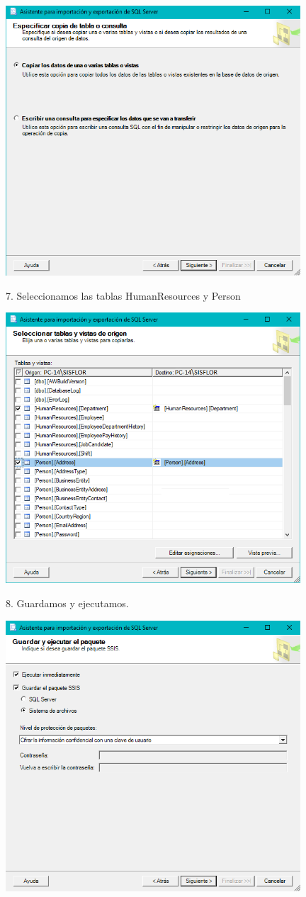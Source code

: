 	\begin{center}
	\includegraphics[width=11cm]{./Imagenes/img6}
	\end{center}	
7. Seleccionamos las tablas HumanResources y Person
	\begin{center}
	\includegraphics[width=11cm]{./Imagenes/img7}
	\end{center}	
8. Guardamos y ejecutamos.
	\begin{center}
	\includegraphics[width=11cm]{./Imagenes/img8}
	\end{center}	
